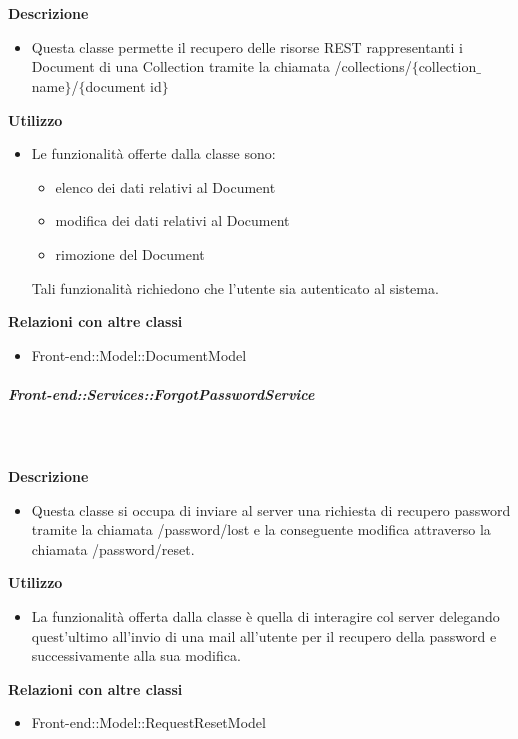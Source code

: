 \begin{itemize}
        \textbf{\\ \\ Descrizione} 
          \begin{itemize}
            \item[] Questa classe permette il recupero delle risorse REST rappresentanti i Document di una Collection tramite la chiamata /collections/$\{$collection$\_$name$\}$/$\{$document id$\}$
          \end{itemize}      
        \textbf{Utilizzo}  
          \begin{itemize}
            \item[] Le funzionalità offerte dalla classe sono: 
\begin{itemize} 
\item elenco dei dati relativi al Document 
\item modifica dei dati relativi al Document
\item rimozione del Document 
\end{itemize} 
Tali funzionalità richiedono che l'utente sia autenticato al sistema.
          \end{itemize}
          \textbf{Relazioni con altre classi}
          \begin{itemize}
              \item{Front-end::Model::DocumentModel}
          \end{itemize}
      \subparagraph{Front-end::Services::ForgotPasswordService}
        
        \textbf{\\ \\ Descrizione} 
          \begin{itemize}
            \item[] Questa classe si occupa di inviare al server una richiesta di recupero password tramite la chiamata /password/lost e la conseguente modifica attraverso la chiamata /password/reset.
          \end{itemize}      
        \textbf{Utilizzo}  
          \begin{itemize}
            \item[] La  funzionalità offerta dalla classe è quella di interagire col server delegando quest'ultimo all'invio di una mail all'utente per il recupero della password e successivamente alla sua modifica.
          \end{itemize}
          \textbf{Relazioni con altre classi}
          \begin{itemize}
              \item{Front-end::Model::RequestResetModel}
          \end{itemize}

\end{itemize}
